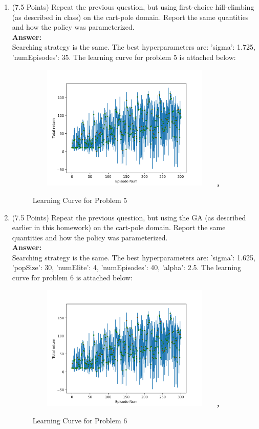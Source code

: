 \documentclass[]{article}
\begin{document}
\begin{enumerate}
    
    \item (7.5 Points) Repeat the previous question, but using first-choice hill-climbing (as described in class) on the cart-pole domain. Report the same quantities and how the policy was parameterized. \\
    \textbf{Answer:}\\
    Searching strategy is the same. The best hyperparameters are: 'sigma': 1.725, 'numEpisodes': 35. The learning curve for problem 5 is attached below:
    \begin{figure}[htbp]
        \centering
        \includegraphics[height=6.0cm,width=9.5cm]{p6.png}，
        \caption{Learning Curve for Problem 5}
    \end{figure}

    
    \item (7.5 Points) Repeat the previous question, but using the GA (as described earlier in this homework) on the cart-pole domain. Report the same quantities and how the policy was parameterized. \\
    \textbf{Answer:}\\
    Searching strategy is the same. The best hyperparameters are: 'sigma': 1.625, 'popSize': 30, 'numElite': 4, 'numEpisodes': 40, 'alpha': 2.5. The learning curve for problem 6 is attached below:
    \begin{figure}[htbp]
        \centering
        \includegraphics[height=6.0cm,width=9.5cm]{p6.png}，
        \caption{Learning Curve for Problem 6}
    \end{figure}



\end{enumerate}
\end{document}
